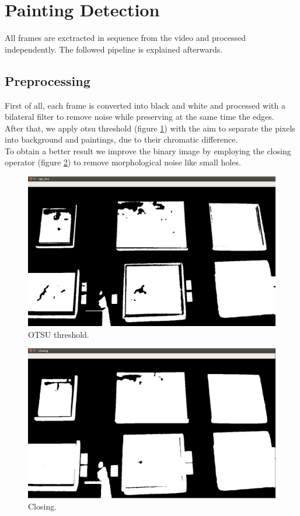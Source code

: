 \documentclass[conference]{IEEEtran}
\begin{document}
\section{Painting Detection}
All frames are exctracted in sequence from the video and processed independently. The followed pipeline is explained afterwards.

\subsection{Preprocessing}
First of all, each frame is converted into black and white and processed with a bilateral filter to remove noise while preserving at the same time the edges.\\
After that, we apply otsu threshold (figure \ref{fig:1_otsu_threshold}) with the aim to separate the pixels into background and paintings, due to their chromatic difference.\\
To obtain a better result we improve the binary image by employing the closing operator (figure \ref{fig:2_closing}) to remove morphological noise like small holes.\\ 

\bigskip


\begin{figure}[htbp]
  \centering
  \includegraphics[width=0.8\columnwidth]{../detection_pipeline/1_otsu_threshold.png}
  \caption{OTSU threshold.}
  \label{fig:1_otsu_threshold}
\end{figure}

\bigskip

\begin{figure}[htbp]
  \centering
  \includegraphics[width=0.8\columnwidth]{../detection_pipeline/2_closing.png}
  \caption{Closing.}
  \label{fig:2_closing}
\end{figure}
\end{document}
